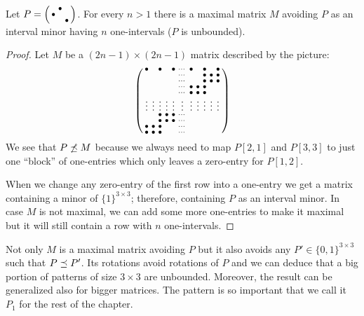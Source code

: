 \begin{thm}
\label{thm:manyints}
Let $P=\left(\begin{smallmatrix} &\bullet& \\\bullet& & \\ & &\bullet\end{smallmatrix}\right)$. For every $n>1$ there is a maximal matrix $M$ avoiding $P$ as an interval minor having $n$ one-intervals ($P$ is unbounded).
\end{thm}
\begin{proof} Let $M$ be a $(2n-1)\times(2n-1)$ matrix described by the picture:
$$\left(\begin{smallmatrix}	\bullet& &\bullet& &\bullet&\cdots&\bullet& &\bullet& &\bullet\\
		 & & & & &\cdots& & &\bullet&\bullet&\bullet\\
		 & & & & &\cdots& & &\bullet&\bullet&\bullet\\
		 & & & & &\cdots&\bullet&\bullet&\bullet& & \\
		 & & & & &\cdots&\bullet&\bullet&\bullet& & \\
		\vdots&\vdots&\vdots&\vdots&\vdots&\vdots&\vdots&\vdots&\vdots&\vdots&\vdots\\
		 & &\bullet&\bullet&\bullet&\cdots& & & & & \\
		 & &\bullet&\bullet&\bullet&\cdots& & & & & \\
		\bullet&\bullet&\bullet& & &\cdots& & & & & \\
		\bullet&\bullet&\bullet& & &\cdots& & & & & \\
		 \end{smallmatrix}\right)$$
We see that $P\not\preceq M$ because we always need to map $P[2,1]$ and $P[3,3]$ to just one ``block'' of one-entries which only leaves a zero-entry for $P[1,2]$.

When we change any zero-entry of the first row into a one-entry we get a matrix containing a minor of $\{1\}^{3\times3}$; therefore, containing $P$ as an interval minor. In case $M$ is not maximal, we can add some more one-entries to make it maximal but it will still contain a row with $n$ one-intervals.
\end{proof}

Not only $M$ is a maximal matrix avoiding $P$ but it also avoids any $P'\in\{0,1\}^{3\times3}$ such that $P\preceq P'$. Its rotations avoid rotations of $P$ and we can deduce that a big portion of patterns of size $3\times3$ are unbounded. Moreover, the result can be generalized also for bigger matrices. The pattern is so important that we call it $P_1$ for the rest of the chapter.

